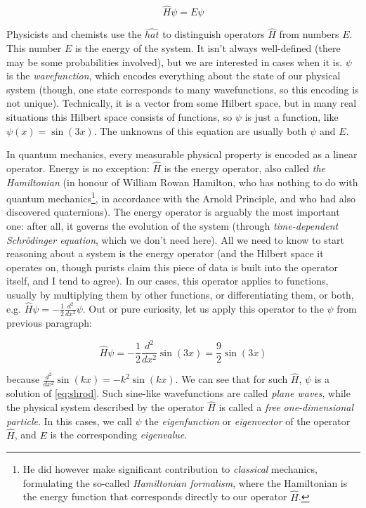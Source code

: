 \documentclass{article}
\begin{document}
\begin{equation} \label{eq:shrod} \hat H \psi = E \psi \end{equation}

Physicists and chemists use the \(\widehat{hat}\) to distinguish operators \(\hat H\) from numbers \(E\). This number \(E\) is the energy of the system. It isn't always well-defined (there may be some probabilities involved), but we are interested in cases when it is. \(\psi\) is the \textit{wavefunction}, which encodes everything about the state of our physical system (though, one state corresponds to many wavefunctions, so this encoding is not unique). Technically, it is a vector from some Hilbert space, but in many real situations this Hilbert space consists of functions, so \(\psi\) is just a function, like \(\psi(x) = \sin(3x)\). The unknowns of this equation are usually both \(\psi\) and \(E\).

In quantum mechanics, every measurable physical property is encoded as a linear operator. Energy is no exception: \(\hat H\) is the energy operator, also called \textit{the Hamiltonian} (in honour of William Rowan Hamilton, who has nothing to do with quantum mechanics\footnote{He did however make significant contribution to \textit{classical} mechanics, formulating the so-called \textit{Hamiltonian formalism}, where the Hamiltonian is the energy function that corresponds directly to our operator \(\hat H\).}, in accordance with the Arnold Principle, and who had also discovered quaternions). The energy operator is arguably the most important one: after all, it governs the evolution of the system (through \textit{time-dependent Schrödinger equation}, which we don't need here). All we need to know to start reasoning about a system is the energy operator (and the Hilbert space it operates on, though purists claim this piece of data is built into the operator itself, and I tend to agree). In our cases, this operator applies to functions, usually by multiplying them by other functions, or differentiating them, or both, e.g. \(\hat H \psi = -\frac{1}{2} \frac{d^2}{dx^2}\psi\). Out or pure curiosity, let us apply this operator to the \(\psi\) from previous paragraph:

\begin{equation} \hat H \psi = -\frac{1}{2} \frac{d^2}{dx^2} \sin(3x) = \frac{9}{2} \sin(3x) \end{equation}

because \(\frac{d^2}{dx^2} \sin(kx) = -k^2 \sin(kx)\). We can see that for such \(\hat H\), \(\psi\) is a solution of \eqref{eq:shrod}. Such sine-like wavefunctions are called \textit{plane waves}, while the physical system described by the operator \(\hat H\) is called a \textit{free one-dimensional particle}. In this cases, we call \(\psi\) the \textit{eigenfunction} or \textit{eigenvector} of the operator \(\hat H\), and \(E\) is the corresponding \textit{eigenvalue}.
\end{document}
